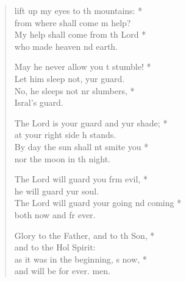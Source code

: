 \begin{verse}
  \begin{patverse}
 lift up my eyes to th mountains: *\Med\\
from where shall come m help?\\
My help shall come from th Lord *\Med\\
who made heaven nd earth.

May he never allow you t stumble! *\Med\\
Let him sleep not, yur guard.\\
No, he sleeps not nr slumbers, *\Med\\
Isral’s guard.

The Lord is your guard and yur shade; *\Med\\
at your right side h stands.\\
By day the sun shall nt smite you *\Med\\
nor the moon in th night.

The Lord will guard you frm evil, *\Med\\
he will guard yur soul.\\
The Lord will guard your going nd coming *\Med\\
both now and fr ever.

Glory to the Father, and to th Son, *\Med\\
and to the Hol Spirit:\\
as it was in the beginning, \pointup{\i}s now, *\Med\\
and will be for ever. men.
  \end{patverse}
\end{verse}
